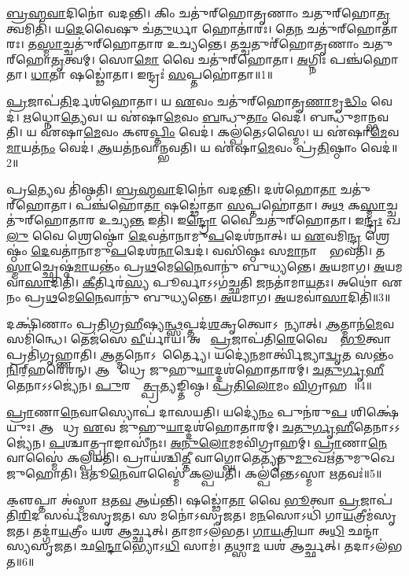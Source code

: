 \ul{𑌬𑍍𑌰}\ul{𑌹𑍍𑌮}\ul{𑌵𑌾}𑌦𑌿𑌨𑍋॑ 𑌵𑌦𑌨𑍍𑌤𑌿।
𑌕𑌿𑌂 𑌚𑌤𑍁॑𑌰𑍍‌\mbox{}𑌹𑍋𑌤𑍃𑌣𑌾𑌂 𑌚𑌤𑍁𑌰𑍍‌\mbox{}𑌹𑍋\ul{𑌤𑍃}𑌤𑍍𑌵𑌮𑌿𑌤𑌿॑।
𑌯\ul{𑌦𑍇}𑌵𑍈𑌷𑍁 𑌚॑\ul{𑌤𑍁}𑌰𑍍𑌧𑌾 𑌹𑍋𑌤𑌾॑𑌰𑌃।
𑌤𑍇\ul{𑌨} 𑌚𑌤𑍁॑𑌰𑍍‌\mbox{}𑌹𑍋𑌤𑌾𑌰𑌃।
𑌤\ul{𑌸𑍍𑌮𑌾}𑌚𑍍𑌚𑌤𑍁॑𑌰𑍍‌\mbox{}𑌹𑍋𑌤𑌾𑌰 𑌉𑌚𑍍𑌯𑌨𑍍𑌤𑍇।
𑌤𑌚𑍍𑌚𑌤𑍁𑌰𑍍॑𑌹𑍋𑌤𑍃𑌣𑌾𑌂 𑌚𑌤𑍁𑌰𑍍‌\mbox{}𑌹𑍋\ul{𑌤𑍃}𑌤𑍍𑌵𑌮𑍍।
𑌸𑍋\ul{𑌮𑍋} 𑌵𑍈 𑌚𑌤𑍁॑𑌰𑍍‌\mbox{}𑌹𑍋𑌤𑌾।
\ul{𑌅}𑌗𑍍𑌨𑌿𑌃 𑌪𑌞𑍍𑌚॑𑌹𑍋𑌤𑌾।
\ul{𑌧𑌾}𑌤𑌾 𑌷𑌡𑍍𑌢𑍋॑𑌤𑌾।
𑌇𑌨𑍍𑌦𑍍𑌰𑌃॑ \ul{𑌸}𑌪𑍍𑌤𑌹𑍋॑𑌤𑌾॥1॥

\ul{𑌪𑍍𑌰}𑌜𑌾𑌪॑\ul{𑌤𑌿}𑌰𑍍𑌦𑌶॑𑌹𑍋𑌤𑌾।
𑌯 \ul{𑌏}𑌵𑌂 𑌚𑌤𑍁॑𑌰𑍍‌\mbox{}𑌹𑍋𑌤𑍃\ul{𑌣𑌾}𑌮𑍃\ul{𑌦𑍍𑌧𑌿𑌂} 𑌵𑍇𑌦॑।
\ul{𑌋}𑌧𑍍𑌨𑍋\ul{𑌤𑍍𑌯𑍇}𑌵।
𑌯 𑌏॑𑌷𑌾\ul{𑌮𑍇}𑌵𑌂 \ul{𑌬}𑌨𑍍𑌧𑍁\ul{𑌤𑌾𑌂} 𑌵𑍇𑌦॑।
𑌬𑌨𑍍𑌧𑍁॑𑌮𑌾𑌨𑍍𑌭𑌵𑌤𑌿।
𑌯 𑌏॑𑌷𑌾\ul{𑌮𑍇}𑌵𑌂 𑌕𑍢\ul{𑌪𑍍𑌤𑌿𑌂} 𑌵𑍇𑌦॑।
𑌕𑌲𑍍𑌪॑𑌤𑍇\-𑌽𑌸𑍍𑌮𑍈।
𑌯 𑌏॑𑌷𑌾\ul{𑌮𑍇}𑌵\ul{𑌮𑌾}𑌯𑌤॑\ul{𑌨𑌂} 𑌵𑍇𑌦॑।
\ul{𑌆}𑌯𑌤॑𑌨𑌵𑌾𑌨𑍍𑌭𑌵𑌤𑌿।
𑌯 𑌏॑𑌷𑌾\ul{𑌮𑍇}𑌵𑌂 𑌪𑍍𑌰॑\ul{𑌤𑌿}𑌷𑍍𑌠𑌾𑌂 𑌵𑍇𑌦॑॥2॥

𑌪𑍍𑌰\ul{𑌤𑍍𑌯𑍇}𑌵 𑌤𑌿॑𑌷𑍍𑌠𑌤𑌿।
\ul{𑌬𑍍𑌰}\ul{𑌹𑍍𑌮}\ul{𑌵𑌾}𑌦𑌿𑌨𑍋॑ 𑌵𑌦𑌨𑍍𑌤𑌿।
𑌦𑌶॑𑌹𑍋\ul{𑌤𑌾} 𑌚𑌤𑍁॑𑌰𑍍‌\mbox{}𑌹𑍋𑌤𑌾।
𑌪𑌞𑍍𑌚॑𑌹𑍋\ul{𑌤𑌾} 𑌷𑌡𑍍𑌢𑍋॑𑌤𑌾 \ul{𑌸}𑌪𑍍𑌤𑌹𑍋॑𑌤𑌾।
𑌅\ul{𑌥} 𑌕\ul{𑌸𑍍𑌮𑌾}𑌚𑍍𑌚𑌤𑍁॑𑌰𑍍‌\mbox{}𑌹𑍋𑌤𑌾𑌰 𑌉𑌚𑍍𑌯\ul{𑌨𑍍𑌤} 𑌇𑌤𑌿॑।
𑌇\ul{𑌨𑍍𑌦𑍍𑌰𑍋} 𑌵𑍈 𑌚𑌤𑍁॑𑌰𑍍‌\mbox{}𑌹𑍋𑌤𑌾।
𑌇\ul{𑌨𑍍𑌦𑍍𑌰𑌃} 𑌖\ul{𑌲𑍁} 𑌵𑍈 𑌶𑍍𑌰𑍇𑌷𑍍𑌠𑍋॑ \ul{𑌦𑍇}𑌵𑌤𑌾॑𑌨𑌾𑌮𑍁\ul{𑌪}\-𑌦𑍇𑌶॑𑌨𑌾𑌤𑍍।
𑌯 \ul{𑌏}𑌵𑌮𑌿\ul{𑌨𑍍𑌦𑍍𑌰}\ul{} 𑌶𑍍𑌰𑍇𑌷𑍍𑌠𑌂॑ \ul{𑌦𑍇}𑌵𑌤𑌾॑𑌨𑌾𑌮𑍁\ul{𑌪}\-𑌦𑍇𑌶॑\ul{𑌨𑌾}𑌦𑍍𑌵𑍇𑌦॑।
𑌵𑌸𑌿॑𑌷𑍍𑌠𑌃 𑌸\ul{𑌮𑌾}𑌨𑌾𑌨𑌾𑌂᳚ 𑌭𑌵𑌤𑌿।
𑌤\ul{𑌸𑍍𑌮𑌾}𑌚𑍍𑌛𑍍𑌰𑍇𑌷𑍍𑌠॑\ul{𑌮𑌾}𑌯𑌨𑍍𑌤𑌂॑ 𑌪𑍍𑌰\ul{𑌥}𑌮𑍇\ul{𑌨𑍈}𑌵𑌾𑌨𑍁॑ 𑌬𑍁𑌧𑍍𑌯𑌨𑍍𑌤𑍇।
\ul{𑌅}𑌯𑌮𑌾𑌗\sn{}।
\ul{𑌅}𑌯𑌮𑌵𑌾॑\ul{𑌸𑌾}𑌦𑌿𑌤𑌿॑।
\ul{𑌕𑍀}𑌰𑍍𑌤𑌿𑌰॑\ul{𑌸𑍍𑌯} 𑌪𑍂𑌰𑍍𑌵𑌾\-𑌽𑌽𑌗॑𑌚𑍍𑌛𑌤𑌿 \ul{𑌜}𑌨𑌤𑌾॑𑌮𑌾\ul{𑌯}𑌤𑌃।
𑌅𑌥𑍋॑ 𑌏𑌨𑌂 𑌪𑍍𑌰\ul{𑌥}𑌮𑍇\ul{𑌨𑍈}𑌵𑌾𑌨𑍁॑ 𑌬𑍁𑌧𑍍𑌯𑌨𑍍𑌤𑍇।
\ul{𑌅}𑌯𑌮𑌾𑌗\sn{}।
\ul{𑌅}𑌯𑌮𑌵𑌾॑\ul{𑌸𑌾}𑌦𑌿𑌤𑌿॑॥3॥\anuvakamend[\ul{𑌸}𑌪𑍍𑌤𑌹𑍋॑𑌤𑌾 𑌪𑍍𑌰\ul{𑌤𑌿}𑌷𑍍𑌠𑌾𑌂 𑌵𑍇𑌦॑ 𑌬𑍁𑌧𑍍𑌯\ul{𑌨𑍍𑌤𑍇} 𑌷𑌟𑍍𑌚॑]

𑌦𑌕𑍍𑌷𑌿॑𑌣𑌾𑌂 𑌪𑍍𑌰𑌤𑌿𑌗𑍍𑌰\ul{𑌹𑍀}𑌷𑍍𑌯\ul{𑌨𑍍𑌥𑍍𑌸}𑌪𑍍𑌤𑌦॑\ul{𑌶}𑌕𑍃𑌤𑍍𑌵𑍋\-𑌽𑌪𑌾᳚𑌨𑍍𑌯𑌾𑌤𑍍।
\ul{𑌆}𑌤𑍍𑌮𑌾𑌨॑\ul{𑌮𑍇}𑌵 𑌸𑌮𑌿॑𑌨𑍍𑌧𑍇।
𑌤𑍇𑌜॑𑌸𑍇 \ul{𑌵𑍀}𑌰𑍍𑌯𑌾॑𑌯।
𑌅𑌥𑍋᳚ \ul{𑌪𑍍𑌰}𑌜𑌾𑌪॑𑌤𑌿\ul{𑌰𑍇}𑌵𑍈𑌨𑌾𑌂᳚ \ul{𑌭𑍂}𑌤𑍍𑌵𑌾 𑌪𑍍𑌰𑌤𑌿॑\-𑌗𑍃𑌹𑍍𑌣𑌾𑌤𑌿।
\ul{𑌆}𑌤𑍍𑌮𑌨𑍋\-𑌽𑌨𑌾᳚𑌰𑍍𑌤𑍍𑌯𑍈।
𑌯𑌦𑍍𑌯𑍇॑\ul{𑌨}𑌮𑌾𑌰𑍍𑌤𑍍𑌵𑌿॑𑌜𑍍𑌯𑌾\ul{𑌦𑍍𑌵𑍃}𑌤 𑌸𑌨𑍍𑌤𑌂॑ \ul{𑌨𑌿}𑌰𑍍‌॒\mbox{}𑌹𑌰𑍇॑𑌰𑌨𑍍।
𑌆𑌗𑍍𑌨𑍀᳚𑌧𑍍𑌰𑍇 𑌜𑍁𑌹𑍁\ul{𑌯𑌾}𑌦𑍍𑌦𑌶॑𑌹𑍋𑌤𑌾𑌰𑌮𑍍।
\ul{𑌚}\ul{𑌤𑍁}\ul{𑌰𑍍𑌗𑍃}\ul{𑌹𑍀}𑌤𑍇𑌨𑌾𑌽𑌽𑌜𑍍𑌯𑍇॑𑌨।
\ul{𑌪𑍁}𑌰𑌸𑍍𑌤𑌾᳚\ul{𑌤𑍍𑌪𑍍𑌰}𑌤𑍍𑌯𑌙𑍍𑌤𑌿𑌷𑍍𑌠\sn{}।
\ul{𑌪𑍍𑌰}\ul{𑌤𑌿}\ul{𑌲𑍋}𑌮𑌂 \ul{𑌵𑌿}𑌗𑍍𑌰𑌾𑌹𑌮𑍍᳚॥4॥

\ul{𑌪𑍍𑌰𑌾}𑌣𑌾\ul{𑌨𑍇}𑌵𑌾𑌸𑍍𑌯𑍋𑌪॑ 𑌦𑌾𑌸𑌯𑌤𑌿।
𑌯𑌦𑍍𑌯𑍇॑\ul{𑌨𑌂} 𑌪𑍁𑌨॑𑌰𑍁\ul{𑌪} 𑌶𑌿𑌕𑍍𑌷𑍇॑𑌯𑍁𑌃।
𑌆𑌗𑍍𑌨𑍀᳚𑌧𑍍𑌰 \ul{𑌏}𑌵 𑌜𑍁॑𑌹𑍁\ul{𑌯𑌾}𑌦𑍍𑌦𑌶॑𑌹𑍋𑌤𑌾𑌰𑌮𑍍।
\ul{𑌚}\ul{𑌤𑍁}\ul{𑌰𑍍𑌗𑍃}\ul{𑌹𑍀}𑌤𑍇𑌨𑌾𑌽𑌽𑌜𑍍𑌯𑍇॑𑌨।
\ul{𑌪}𑌶𑍍𑌚𑌾𑌤𑍍𑌪𑍍𑌰𑌾𑌙𑌾𑌸𑍀॑𑌨𑌃।
\ul{𑌅}\ul{𑌨𑍁}\ul{𑌲𑍋}𑌮𑌮𑌵𑌿॑𑌗𑍍𑌰𑌾𑌹𑌮𑍍।
\ul{𑌪𑍍𑌰𑌾}𑌣𑌾\ul{𑌨𑍇}𑌵𑌾𑌸𑍍𑌮𑍈॑ 𑌕𑌲𑍍𑌪𑌯𑌤𑌿।
𑌪𑍍𑌰𑌾𑌯॑𑌶𑍍𑌚𑌿\ul{𑌤𑍍𑌤𑍀} 𑌵𑌾𑌗𑍍𑌘𑍋𑌤𑍇𑌤𑍍𑌯𑍃॑𑌤𑍁\ul{𑌮𑍁}𑌖𑌋॑𑌤𑍁𑌮𑍁𑌖𑍇 𑌜𑍁𑌹𑍋𑌤𑌿।
\ul{𑌋}𑌤𑍂\ul{𑌨𑍇}𑌵𑌾𑌸𑍍𑌮𑍈॑ 𑌕𑌲𑍍𑌪𑌯𑌤𑌿।
𑌕𑌲𑍍𑌪॑𑌨𑍍𑌤𑍇\-𑌽𑌸𑍍𑌮𑌾 \ul{𑌋}𑌤𑌵𑌃॑॥5॥

𑌕𑍢॒𑌪𑍍𑌤𑌾 𑌅॑𑌸𑍍𑌮𑌾 \ul{𑌋}𑌤\ul{𑌵} 𑌆𑌯॑𑌨𑍍𑌤𑌿।
𑌷𑌡𑍍𑌢𑍋॑\ul{𑌤𑌾} 𑌵𑍈 \ul{𑌭𑍂}𑌤𑍍𑌵𑌾 \ul{𑌪𑍍𑌰}𑌜𑌾𑌪॑𑌤𑌿\ul{𑌰𑌿}𑌦 𑌸𑌰𑍍𑌵॑𑌮𑌸𑍃𑌜𑌤।
𑌸 𑌮𑌨𑍋॑\-𑌽𑌸𑍃𑌜𑌤।
𑌮\ul{𑌨}𑌸𑍋𑌽𑌧𑌿॑ 𑌗𑌾\ul{𑌯}𑌤𑍍𑌰𑍀𑌮॑𑌸𑍃𑌜𑌤।
𑌤𑌦𑍍𑌗𑌾॑\ul{𑌯}𑌤𑍍𑌰𑍀𑌂 𑌯𑌶॑ 𑌆𑌰𑍍𑌚𑍍𑌛𑌤𑍍।
𑌤𑌾𑌮𑌾𑌽𑌲॑𑌭𑌤।
\ul{𑌗𑌾}\ul{𑌯}\ul{𑌤𑍍𑌰𑌿}𑌯𑌾 𑌅\ul{𑌧𑌿} 𑌛𑌨𑍍𑌦𑌾॑𑌸𑍍𑌯𑌸𑍃𑌜𑌤।
𑌛\ul{𑌨𑍍𑌦𑍋}𑌭𑍍𑌯𑍋𑌽\ul{𑌧𑌿} 𑌸𑌾𑌮॑।
𑌤𑌥𑍍𑌸𑌾\ul{𑌮} 𑌯𑌶॑ 𑌆𑌰𑍍𑌚𑍍𑌛𑌤𑍍।
𑌤𑌦𑌾𑌽𑌲॑𑌭𑌤॥6॥

